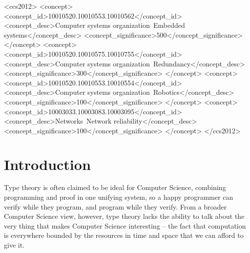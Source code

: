 \documentclass[acmsmall,screen]{acmart}
\begin{document}
\begin{CCSXML}
<ccs2012>
 <concept>
  <concept_id>10010520.10010553.10010562</concept_id>
  <concept_desc>Computer systems organization~Embedded systems</concept_desc>
  <concept_significance>500</concept_significance>
 </concept>
 <concept>
  <concept_id>10010520.10010575.10010755</concept_id>
  <concept_desc>Computer systems organization~Redundancy</concept_desc>
  <concept_significance>300</concept_significance>
 </concept>
 <concept>
  <concept_id>10010520.10010553.10010554</concept_id>
  <concept_desc>Computer systems organization~Robotics</concept_desc>
  <concept_significance>100</concept_significance>
 </concept>
 <concept>
  <concept_id>10003033.10003083.10003095</concept_id>
  <concept_desc>Networks~Network reliability</concept_desc>
  <concept_significance>100</concept_significance>
 </concept>
</ccs2012>
\end{CCSXML}




\maketitle

\section{Introduction}
\label{sec:introduction}

Type theory is often claimed to be ideal for Computer Science,
combining programming and proof in one unifying system, so a happy
programmer can verify while they program, and program while they
verify. From a broader Computer Science view, however, type theory
lacks the ability to talk about the very thing that makes Computer
Science interesting -- the fact that computation is everywhere bounded
by the resources in time and space that we can afford to give it.
\end{document}
